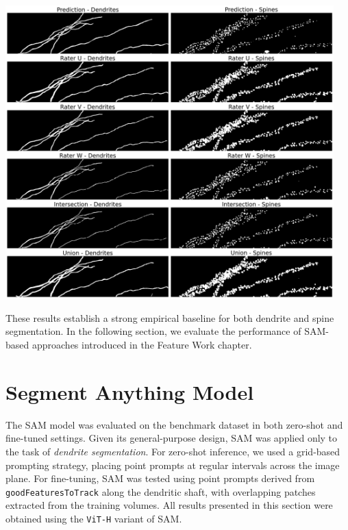 \begin{center}
\includegraphics[width=0.95\textwidth]{figures/23_deepd3_qualitative.png}
\label{fig:deepd3_qualitative}
\end{center}

These results establish a strong empirical baseline for both dendrite and spine segmentation. In the following section, we evaluate the performance of \gls{SAM}-based approaches introduced in the Feature Work chapter.

\section{Segment Anything Model}
The \gls{SAM} model was evaluated on the benchmark dataset in both zero-shot and fine-tuned settings. Given its general-purpose design, \gls{SAM} was applied only to the task of \textit{dendrite segmentation}. For zero-shot inference, we used a grid-based prompting strategy, placing point prompts at regular intervals across the image plane. For fine-tuning, \gls{SAM} was tested using point prompts derived from \texttt{goodFeaturesToTrack} along the dendritic shaft, with overlapping patches extracted from the training volumes. All results presented in this section were obtained using the \texttt{\gls{ViT}-H} variant of \gls{SAM}.

